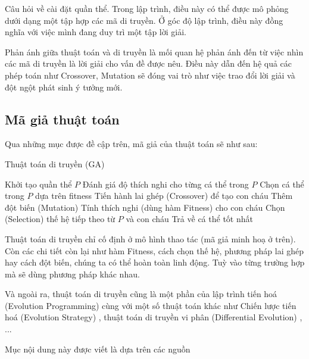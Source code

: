 Câu hỏi về cài đặt quần thể. Trong lập trình, điều này có thể được mô phỏng dưới dạng một tập hợp các mã di truyền. Ở góc độ lập trình, điều này đồng nghĩa với việc mình đang duy trì một tập lời giải.

Phản ánh giữa thuật toán và di truyền là mối quan hệ phản ánh đến từ việc nhìn các mã di truyền là lời giải cho vấn đề được nêu. Điều này dẫn đến hệ quả các phép toán như Crossover, Mutation sẽ đóng vai trò như việc trao đổi lời giải và đột ngột phát sinh ý tưởng mới.

\subsection{Mã giả thuật toán}
Qua những mục được đề cập trên, mã giả của thuật toán sẽ như sau:
\begin{algorithm}
	\caption{Thuật toán di truyền (GA)}
	\begin{algorithmic}[1]
		\State Khởi tạo quần thể $P$
		\State Đánh giá độ thích nghi cho từng cá thể trong $P$
		\State Chọn cá thể trong $P$ dựa trên fitness
		\State Tiến hành lai ghép (Crossover) để tạo con cháu
		\State Thêm đột biến (Mutation)
		\State Tính thích nghi (dùng hàm Fitness) cho con cháu
		\State Chọn (Selection) thế hệ tiếp theo từ $P$ và con cháu
		\EndWhile
		\State Trả về cá thể tốt nhất
	\end{algorithmic}
\end{algorithm}

Thuật toán di truyền chỉ cố định ở mô hình thao tác (mã giả minh hoạ ở trên). Còn các chi tiết còn lại như hàm Fitness, cách chọn thế hệ, phương pháp lai ghép hay cách đột biến, chúng ta có thể hoàn toàn linh động. Tuỳ vào từng trường hợp mà sẽ dùng phương pháp khác nhau.

\noindent
Và ngoài ra, thuật toán di truyền cũng là một phần của lập trình tiến hoá (Evolution Programming) \cite{evolutionProgramming} cùng với một số thuật toán khác như Chiến lược tiến hoá (Evolution Strategy) \cite{EvolutionStrategy}, thuật toán di truyền vi phân (Differential Evolution) \cite{DifferientalEvolution1} \cite{DifferientalEvolution2}, ...

\par
Mục nội dung này được viết là dựa trên các nguồn \cite{GA1} \cite{GA2} \cite{GA3} \cite{GA4} \cite{GA5_Overview}
